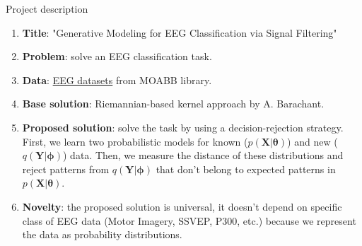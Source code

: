 \documentclass{beamer}
\newcommand\blfootnote[1]{%
	\begingroup
	\renewcommand\thefootnote{}\footnote{#1}%
	\addtocounter{footnote}{-1}%
	\endgroup
}
\newcommand{\btheta}{\boldsymbol{\theta}}
\newcommand{\bphi}{\boldsymbol{\phi}}
\begin{document}
\begin{frame}{Project description}
\begin{enumerate}
\item \textbf{Title}: "Generative Modeling for EEG Classification via Signal Filtering"
\item \textbf{Problem}: solve an EEG classification task. 
\item \textbf{Data}: \href{https://neurotechx.github.io/moabb/dataset\_summary.html}{EEG datasets} from MOABB library. 
\item \textbf{Base solution}: Riemannian-based kernel approach by A. Barachant.
\item \textbf{Proposed solution}: solve the task by using a decision-rejection strategy. First, we learn two probabilistic models for known ($p(\mathbf{X} | \btheta)$) and new ($q(\mathbf{Y} | \bphi)$) data. Then, we measure the distance of these distributions and reject patterns from $q(\mathbf{Y} | \bphi)$ that don't belong to expected patterns in $p(\mathbf{X} | \btheta)$.
\item \textbf{Novelty}: the proposed solution is universal, it doesn't depend on specific class of EEG data (Motor Imagery, SSVEP, P300, etc.) because we represent the data as probability distributions. 

%		

\end{enumerate}

\end{frame}
\end{document}
